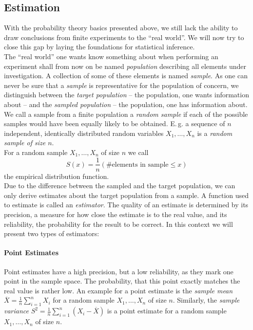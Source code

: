 \documentclass{article}
\theoremstyle{definition}
\begin{document}
\subsection{Estimation}
With the probability theory basics presented above, we still lack the ability to draw conclusions from finite experiments to the ``real world''.
We will now try to close this gap by laying the foundations for statistical inference.
\\
The ``real world'' one wants know something about when performing an experiment shall from now on be named \emph{population} describing all elements under investigation.
A collection of some of these elements is named \emph{sample}.
As one can never be sure that a \emph{sample} is representative for the population of concern, we distinguish between the \emph{target population} -- the population, one wants information about -- and the \emph{sampled population} -- the population, one has information about.
\\
We call a sample from a finite population a \emph{random sample} if each of the possible samples would have been equally likely to be obtained.
E.\,g. a sequence of $n$ independent, identically distributed random variables $X_1, \ldots, X_n$ is a \emph{random sample of size $n$}.
\\
For a random sample $X_1, \ldots, X_n$ of size $n$ we call
\begin{equation}
S(x) = \frac{1}{n}(\text{\#elements in sample}\leq x)
\end{equation}
the empirical distribution function.
\\
Due to the difference between the sampled and the target population, we can only derive estimates about the target population from a sample.
A function used to estimate is called an \emph{estimator}.
The quality of an estimate is determined by its precision, a measure for how close the estimate is to the real value, and its reliability, the probability for the result to be correct.
In this context we will present two types of estimators:
\paragraph{Point Estimates}
Point estimates have a high precision, but a low reliability, as they mark one point in the sample space.
The probability, that this point exactly matches the real value is rather low.
An example for a point estimate is the \emph{sample mean} $\overline{X} = \frac{1}{n}\sum_{i=1}^{n}X_i$ for a random sample $X_1,\ldots,X_n$ of size $n$.
Similarly, the \emph{sample variance} $S^2 = \frac{1}{n}\sum_{i=1}^{n}(X_i-\overline{X})$ is a point estimate for a random sample $X_1,\ldots,X_n$ of size $n$.
\end{document}
